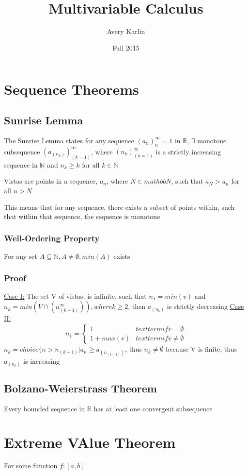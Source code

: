 \documentclass[11 pt, twoside]{article}
\begin{document}
\title{Multivariable Calculus}
\author{Avery Karlin}
\date{Fall 2015}

\maketitle
\newpage
\tableofcontents
\newpage



\section{Sequence Theorems}
\subsection{Sunrise Lemma}
The Sunrise Lemma states for any sequence $(a_n)^\infty_n=1$ in $\mathbb{R}$, $\exists$ monotone subsequence $(a_(n_k))^\infty_(k=1)$, where $(n_k)^\infty_(k=1)$ is a strictly increasing sequence in $\mathbb{N}$ and $n_k \geq k$ for all $k \in \mathbb{N}$

Vistas are points in a sequence, $a_n$, where  $N \in mathbb{N}$, such that $a_N > a_n$ for all $n > N$

This means that for any sequence, there exists a subset of points within, such that within that sequence, the sequence is monotone

\subsubsection{Well-Ordering Property}
For any set $A \subseteq \mathbb{N}, A \neq \emptyset, min(A)$ exists

\subsubsection{Proof}
\underline{Case I:} The set V of vistas, is infinite, such that $n_1 = min(v)$ and $n_k = min(V \cap (n_(k-1)^\infty)), where k \geq 2$, then $a_(n_k)$ is strictly decreasing
\underline{Case II:}
\[ n_1 =
\begin{cases}
1 & textterm{if v = \emptyset} \\
1 + max(v) & textterm{if v \neq \emptyset}
\end{cases} \]
$n_k = choice\{n > n_(k-1) | a_n \geq a_(n_(k-1))$, thus $n_k \neq \emptyset$ because V is finite, thus $a_(n_k)$ is increasing

\subsection{Bolzano-Weierstrass Theorem}
Every bounded sequence in $\mathbb{R}$ has at least one convergent subsequence

\section{Extreme VAlue Theorem}
For some function $f:[a, b]$ 
\end{document}
